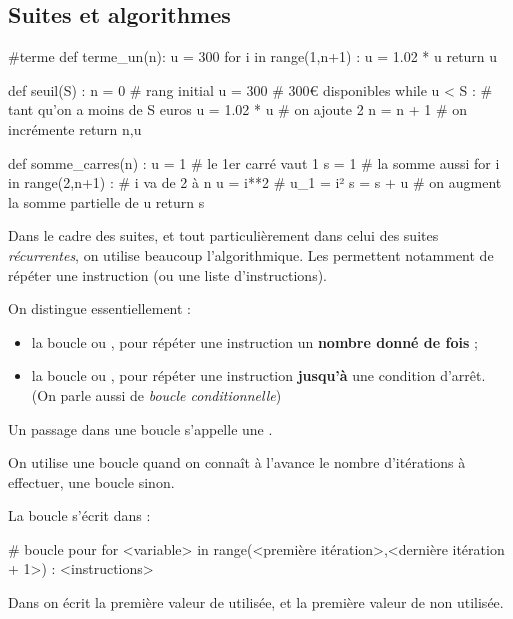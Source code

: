 \documentclass[a4paper,11pt]{article}
\begin{document}
\subsection{Suites et algorithmes}

\begin{pyconcode}
#terme
def terme_un(n):
	u = 300
	for i in range(1,n+1) :
		u = 1.02 * u
	return u
	

def seuil(S) :
	n = 0					# rang initial
	u = 300					# 300€ disponibles
	while u < S :				# tant qu'on a moins de S euros
		u = 1.02 * u		# on ajoute 2%
		n = n + 1		    # on incrémente
	return n,u
	

def somme_carres(n) :
	u = 1						# le 1er carré vaut 1
	s = 1						# la somme aussi
	for i in range(2,n+1)	:	# i va de 2 à n
		u = i**2		   		# u_1 = i²
		s = s + u		    	# on augment la somme partielle de u
	return s
	

\end{pyconcode}

\begin{ccadre}
Dans le cadre des suites, et tout particulièrement dans celui des suites \textit{récurrentes}, on utilise beaucoup l'algorithmique. Les  permettent notamment de répéter une instruction (ou une liste d'instructions).

On distingue essentiellement :

\begin{itemize}
	\item la boucle  ou , pour répéter une instruction un \textbf{nombre donné de fois} ;
	\item la boucle  ou , pour répéter une instruction \textbf{jusqu'à} une condition d'arrêt. (On parle aussi de \textit{boucle conditionnelle})
\end{itemize}

Un passage dans une boucle s'appelle une .

On utilise une boucle  quand on connaît à l'avance le nombre d'itérations à effectuer, une boucle  sinon.
\end{ccadre}

\begin{cpython}
La boucle  s'écrit dans \calgpython{} :
\vspace{-0.15cm}
\begin{envpython}[15cm]
	# boucle pour
	for <variable> in range(<première itération>,<dernière itération + 1>) :
		<instructions>
\end{envpython}
 Dans  on écrit la première valeur de  utilisée, et la première valeur de  non utilisée.
\end{cpython}
\end{document}
